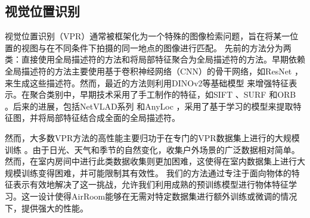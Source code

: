 \subsection{视觉位置识别}

视觉位置识别（VPR）通常被框架化为一个特殊的图像检索问题，旨在将某一位置的视图与在不同条件下拍摄的同一地点的图像进行匹配。
先前的方法分为两类：直接使用全局描述符的方法和将局部特征聚合为全局描述符的方法。早期依赖全局描述符的方法主要使用基于卷积神经网络（CNN）的骨干网络，如ResNet \cite{he2015deepresiduallearningimage}，来生成这些描述符。然而，最近的方法则利用DINOv2等基础模型 \cite{oquab2024dinov2learningrobustvisual} 来增强特征表示。在聚合类别中，早期技术采用了手工制作的特征，如SIFT \cite{Lowe2004DistinctiveIF}、SURF \cite{10.1007/11744023_32} 和ORB \cite{6126544}。后来的进展，包括NetVLAD系列 \cite{arandjelović2016netvladcnnarchitectureweakly, hausler2021patchnetvladmultiscalefusionlocallyglobal} 和AnyLoc \cite{keetha2023anylocuniversalvisualplace}，采用了基于学习的模型来提取特征图，并将局部特征结合成全面的全局描述符。

然而，大多数VPR方法的高性能主要归功于在专门的VPR数据集上进行的大规模训练 \cite{keetha2023anylocuniversalvisualplace}。由于日光、天气和季节的自然变化，收集户外场景的广泛数据相对简单。然而，在室内房间中进行此类数据收集则更加困难，这使得在室内数据集上进行大规模训练变得困难，并可能限制其有效性。
我们的方法通过专注于面向物体的特征表示有效地解决了这一挑战，允许我们利用成熟的预训练模型进行物体特征学习。这一设计使得AirRoom能够在无需对特定数据集进行额外训练或微调的情况下，提供强大的性能。
